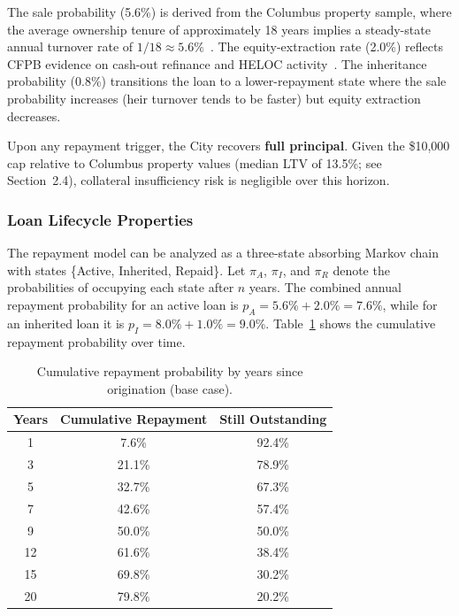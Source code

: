 \documentclass[11pt, letterpaper]{article}
\begin{document}
The sale probability (5.6\%) is derived from the Columbus property sample, where the average ownership tenure of approximately 18 years implies a steady-state annual turnover rate of $1/18 \approx 5.6\%$~\cite{ahs2021}. The equity-extraction rate (2.0\%) reflects CFPB evidence on cash-out refinance and HELOC activity~\cite{cfpb2023}. The inheritance probability (0.8\%) transitions the loan to a lower-repayment state where the sale probability increases (heir turnover tends to be faster) but equity extraction decreases.

Upon any repayment trigger, the City recovers \textbf{full principal}. Given the \$10{,}000 cap relative to Columbus property values (median LTV of 13.5\%; see Section~2.4), collateral insufficiency risk is negligible over this horizon.

\subsubsection{Loan Lifecycle Properties}

The repayment model can be analyzed as a three-state absorbing Markov chain~\cite{grinstead1997} with states \{Active, Inherited, Repaid\}. Let $\pi_A$, $\pi_I$, and $\pi_R$ denote the probabilities of occupying each state after $n$ years. The combined annual repayment probability for an active loan is $p_A = 5.6\% + 2.0\% = 7.6\%$, while for an inherited loan it is $p_I = 8.0\% + 1.0\% = 9.0\%$. Table~\ref{tab:lifecycle} shows the cumulative repayment probability over time.

\begin{table}[H]
  \centering
  \caption{Cumulative repayment probability by years since origination (base case).}
  \label{tab:lifecycle}
  \begin{tabular}{@{}ccc@{}}
    \toprule
    \textbf{Years} & \textbf{Cumulative Repayment} & \textbf{Still Outstanding} \\
    \midrule
    1  & 7.6\%  & 92.4\% \\
    3  & 21.1\% & 78.9\% \\
    5  & 32.7\% & 67.3\% \\
    7  & 42.6\% & 57.4\% \\
    9  & 50.0\% & 50.0\% \\
    12 & 61.6\% & 38.4\% \\
    15 & 69.8\% & 30.2\% \\
    20 & 79.8\% & 20.2\% \\
    \bottomrule
  \end{tabular}
\end{table}
\end{document}
